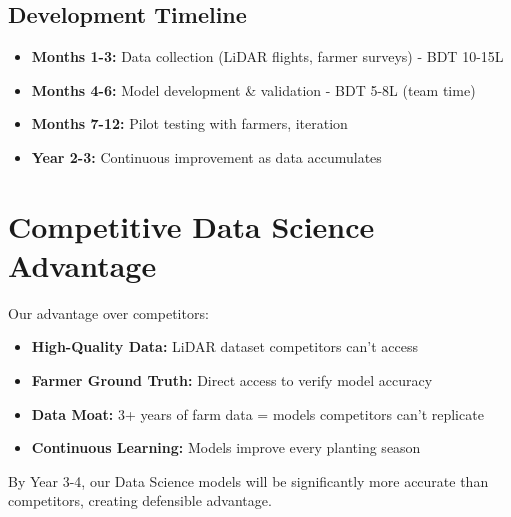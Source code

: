 \subsection{Development Timeline}

\begin{itemize}
    \item \textbf{Months 1-3:} Data collection (LiDAR flights, farmer surveys) - BDT 10-15L
    \item \textbf{Months 4-6:} Model development & validation - BDT 5-8L (team time)
    \item \textbf{Months 7-12:} Pilot testing with farmers, iteration
    \item \textbf{Year 2-3:} Continuous improvement as data accumulates
\end{itemize}

\section{Competitive Data Science Advantage}

Our advantage over competitors:

\begin{itemize}
    \item \textbf{High-Quality Data:} LiDAR dataset competitors can't access
    \item \textbf{Farmer Ground Truth:} Direct access to verify model accuracy
    \item \textbf{Data Moat:} 3+ years of farm data = models competitors can't replicate
    \item \textbf{Continuous Learning:} Models improve every planting season
\end{itemize}

By Year 3-4, our Data Science models will be significantly more accurate than competitors, creating defensible advantage.

